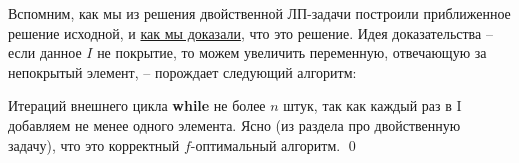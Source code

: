 
Вспомним, как мы из решения двойственной ЛП-задачи построили приближенное решение исходной, и \underline{как мы доказали}, что это решение. Идея доказательства -- если данное $I$ не покрытие, то можем увеличить переменную, отвечающую за непокрытый элемент, -- порождает следующий алгоритм:

\begin{algorithm}
	\DontPrintSemicolon
\end{algorithm}

Итераций внешнего цикла \textbf{while} не более $n$ штук, так как каждый раз в I добавляем не менее одного элемента. Ясно (из раздела про двойственную задачу), что это корректный $f$-оптимальный алгоритм. \qed
